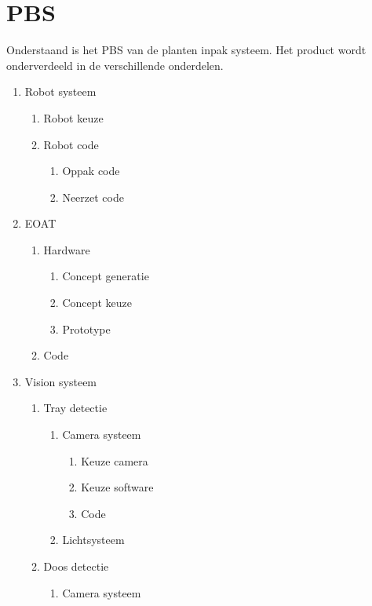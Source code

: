 \section*{PBS}

Onderstaand is het PBS van de planten inpak systeem. Het product wordt onderverdeeld in de verschillende onderdelen.

\begin{enumerate}[label*=\arabic*.]
	\item Robot systeem
	\begin{enumerate}[label*=\arabic*.]
		\item Robot keuze
		\item Robot code
		\begin{enumerate}[label*=\arabic*.]
			\item Oppak code
			\item Neerzet code
		\end{enumerate}
	\end{enumerate}
	\item EOAT
	\begin{enumerate}[label*=\arabic*.]
		\item Hardware
		\begin{enumerate}[label*=\arabic*.]
			\item Concept generatie
			\item Concept keuze
			\item Prototype
		\end{enumerate}
		\item Code
	\end{enumerate}
	\item Vision systeem
	\begin{enumerate}[label*=\arabic*.]
		\item Tray detectie
		\begin{enumerate}[label*=\arabic*.]
			\item Camera systeem
			\begin{enumerate}[label*=\arabic*.]
				\item Keuze camera
				\item Keuze software
				\item Code
			\end{enumerate}
			\item Lichtsysteem
		\end{enumerate}
		\item Doos detectie
			\begin{enumerate}[label*=\arabic*.]
				\item Camera systeem

\end{enumerate}
\end{enumerate}
\end{enumerate}
